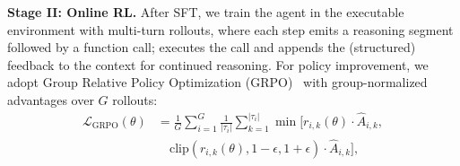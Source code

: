 \noindent \textbf{Stage II: Online RL.}
After SFT, we train the agent in the executable environment with multi-turn rollouts, where each step emits a reasoning segment followed by a function call; \env{} executes the call and appends the (structured) feedback to the context for continued reasoning.
For policy improvement, we adopt Group Relative Policy Optimization (GRPO)~\cite{shao2024deepseekmath} with group-normalized advantages over $G$ rollouts:
\begin{equation*}
    \begin{aligned}
        \mathcal{L}_{\text{GRPO}}(\theta)&=\frac{1}{G}\sum_{i=1}^G\frac{1}{|\tau_i|}\sum_{k=1}^{|\tau_i|}\min[r_{i,k}(\theta)\cdot\hat{A}_{i,k},\\
        &\quad\text{clip}(r_{i,k}(\theta),1-\epsilon,1+\epsilon)\cdot\hat{A}_{i,k}],
    \end{aligned}
\end{equation*}
